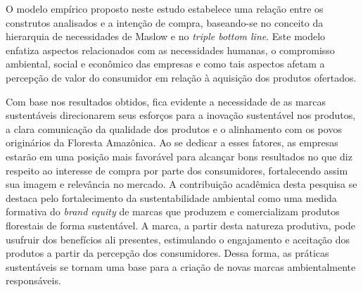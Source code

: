 O modelo empírico proposto neste estudo estabelece uma relação entre os construtos analisados e a intenção de compra, baseando-se no conceito da hierarquia de necessidades de Maslow e no \textit{triple bottom line}. Este modelo enfatiza aspectos relacionados com as necessidades humanas, o compromisso ambiental, social e econômico das empresas e como tais aspectos afetam a percepção de valor do consumidor em relação à aquisição dos produtos ofertados.

Com base nos resultados obtidos, fica evidente a necessidade de as marcas sustentáveis direcionarem seus esforços para a inovação sustentável nos produtos, a clara comunicação da qualidade dos produtos e o alinhamento com os povos originários da Floresta Amazônica. Ao se dedicar a esses fatores, as empresas estarão em uma posição mais favorável para alcançar bons resultados no que diz respeito ao interesse de compra por parte dos consumidores, fortalecendo assim sua imagem e relevância no mercado.
A contribuição acadêmica desta pesquisa se destaca pelo fortalecimento da sustentabilidade ambiental como uma medida formativa do \textit{brand equity} de marcas que produzem e comercializam produtos florestais de forma sustentável. A marca, a partir desta natureza produtiva, pode usufruir dos benefícios ali presentes, estimulando o engajamento e aceitação dos produtos a partir da percepção dos consumidores. Dessa forma, as práticas sustentáveis se tornam uma base para a criação de novas marcas ambientalmente responsáveis.